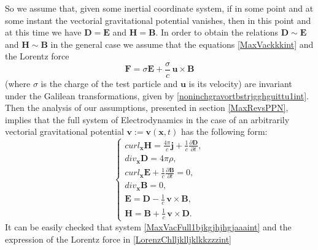 \documentclass{article}
\theoremstyle{definition}
\theoremstyle{remark}
\renewcommand{\vec}[1]{\mathbf{#1}}
\newcommand{\R}{\mathbb{R}}
\newcommand{\er}{\eqref}
\newcommand{\R}{{\mathbb{R}}}
\newcommand{\er}{\eqref}
\begin{document}
So we assume that, given some inertial coordinate system, if in some
point and at some instant the vectorial gravitational potential
vanishes, then in this point and at this time we have $\vec D= \vec
E$ and $\vec H=\vec B$. In order to obtain the relations $\vec D\sim
\vec E$ and $\vec H\sim \vec B$ in the general case we assume that
the equations \er{MaxVackkkint} and the Lorentz force
\begin{equation}
\label{LorenzChlljklljklkkzzzint} \vec F=\sigma \vec
E+\frac{\sigma}{c}\,\vec u\times \vec B
\end{equation}
(where $\sigma$ is the charge of the test particle and $\vec u$ is
its velocity) are invariant under the Galilean transformations,
given by \er{noninchgravortbstrjgghguittu1int}. Then the analysis of
our assumptions, presented in section \ref{MaxRevsPPN}, implies that
the full system of Electrodynamics in the case of an arbitrarily
vectorial gravitational potential $\vec v:=\vec v(\vec x,t)$ has the
following form:
\begin{equation}\label{MaxVacFull1bjkgjhjhgjaaaint}
\begin{cases}
curl_{\vec x} \vec H= \frac{4\pi}{c}\vec j+\frac{1}{c}\frac{\partial
\vec D}{\partial t},\\
div_{\vec x} \vec D= 4\pi\rho,\\
curl_{\vec x} \vec E+\frac{1}{c}\frac{\partial \vec B}{\partial t}=0,\\
div_{\vec x} \vec B=0,\\
\vec E=\vec D-\frac{1}{c}\,\vec v\times \vec B,\\
\vec H=\vec B+\frac{1}{c}\,\vec v\times \vec D.
\end{cases}
\end{equation}
It can be easily checked that system
\er{MaxVacFull1bjkgjhjhgjaaaint} and the expression of the Lorentz
force in \er{LorenzChlljklljklkkzzzint}
\end{document}

